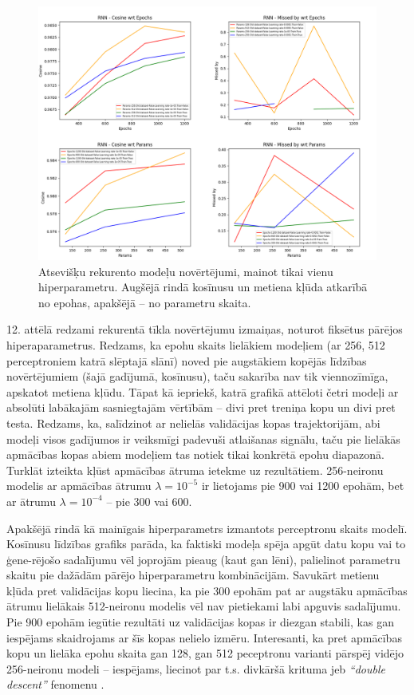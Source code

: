 \documentclass[12pt, a4paper]{article}
\numberwithin{equation}{section} %
\begin{document}
\begin{figure}[t!]
    \centering
    \includegraphics[width=16cm,page=1]{../img/rnn-independent-params-epoch.png}
    \caption{Atsevišķu rekurento modeļu novērtējumi, mainot tikai vienu hiperparametru. Augšējā rindā kosīnusu un metiena kļūda atkarībā no epohas, apakšējā -- no parametru skaita.}
\end{figure}

12. attēlā redzami rekurentā tīkla novērtējumu izmaiņas, noturot fiksētus pārējos hiperaparametrus. Redzams, ka epohu skaits lielākiem modeļiem (ar 256, 512 perceptroniem katrā slēptajā slānī) noved pie augstākiem kopējās līdzības novērtējumiem (šajā gadījumā, kosīnusu), taču sakarība nav tik viennozīmīga, apskatot metiena kļūdu. Tāpat kā iepriekš, katrā grafikā attēloti četri modeļi ar absolūti labākajām sasniegtajām vērtībām -- divi pret treniņa kopu un divi pret testa. Redzams, ka, salīdzinot ar nelielās validācijas kopas trajektorijām, abi modeļi visos gadījumos ir veiksmīgi padevuši atlaišanas signālu, taču pie lielākās apmācības kopas abiem modeļiem tas notiek tikai konkrētā epohu diapazonā. Turklāt izteikta kļūst apmācības ātruma ietekme uz rezultātiem. 256-neironu modelis ar apmācības ātrumu $\lambda = 10^{-5}$ ir lietojams pie 900 vai 1200 epohām, bet ar ātrumu $\lambda = 10^{-4}$ -- pie 300 vai 600. 

Apakšējā rindā kā mainīgais hiperparametrs izmantots perceptronu skaits modelī. Kosīnusu līdzības grafiks parāda, ka faktiski modeļa spēja apgūt datu kopu vai to ģene-rējošo sadalījumu vēl joprojām pieaug (kaut gan lēni), palielinot parametru skaitu pie dažādām pārējo hiperparametru kombinācijām. Savukārt metienu kļūda pret validācijas kopu liecina, ka pie 300 epohām pat ar augstāku apmācības ātrumu lielākais 512-neironu modelis vēl nav pietiekami labi apguvis sadalījumu. Pie 900 epohām iegūtie rezultāti uz validācijas kopas ir diezgan stabili, kas gan iespējams skaidrojams ar šīs kopas nelielo izmēru. Interesanti, ka pret apmācības kopu un lielāka epohu skaita gan 128, gan 512 peceptronu varianti pārspēj vidējo 256-neironu modeli -- iespējams, liecinot par t.s. divkāršā krituma jeb \textit{``double descent''} fenomenu \cite{nakkiran2021deep}.
\end{document}
